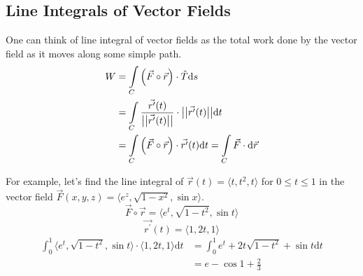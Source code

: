 \subsection{Line Integrals of Vector Fields}
\noindent
One can think of line integral of vector fields as the total work done by the vector field as it moves along some simple path.
\begin{align*}
	W &= \int\limits_{C}{\left(\vec{F}\circ\vec{r}\right) \cdot \hat{T}\mathrm{d}s} \\
	&= \int\limits_{C}{\frac{\vec{r^\prime}(t)}{\big\lvert \big\lvert \vec{r^\prime}(t) \big\rvert \big\rvert} \cdot \big\lvert \big\lvert \vec{r^\prime}(t) \big\rvert \big\rvert\mathrm{d}t} \\
	&= \int\limits_{C}{\left(\vec{F}\circ\vec{r}\right) \cdot \vec{r^\prime}(t)\mathrm{d}t} = \int\limits_{C}{\vec{F} \cdot \mathrm{d}\vec{r}}
\end{align*}

\noindent
For example, let's find the line integral of $\vec{r}(t) = \langle t, t^2, t \rangle$ for $0 \leq t \leq 1$ in the vector field $\vec{F}(x,y,z) = \langle e^z, \sqrt{1-x^2}, \sin{x} \rangle$.
\begin{equation*}
	\vec{F}\circ\vec{r} = \langle e^t, \sqrt{1-t^2}, \sin{t}\rangle
\end{equation*}
\begin{equation*}
	\vec{r^\prime}(t) = \langle 1, 2t, 1 \rangle
\end{equation*}
\begin{align*}
	\int_{0}^{1}{\langle e^t, \sqrt{1-t^2}, \sin{t} \rangle \cdot \langle 1, 2t, 1 \rangle\mathrm{d}t} &= \int_{0}^{1}{e^t + 2t\sqrt{1 - t^2} + \sin{t}\mathrm{d}t} \\
	&= e - \cos{1} + \frac{2}{3}
\end{align*}


